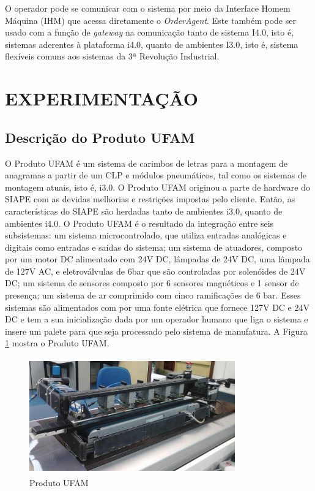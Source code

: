 \documentclass[10pt,letterpaper,twocolumn]{IEEEtran}
\begin{document}
O operador pode se comunicar com o sistema por meio da Interface Homem Máquina (IHM) que acessa diretamente o \textit{OrderAgent}. Este também pode ser usado com a função de \textit{gateway} na comunicação tanto de sistema I4.0, isto é, sistemas aderentes à plataforma i4.0, quanto de ambientes I3.0, isto é, sistema flexíveis comuns aos sistemas da 3ª Revolução Industrial.


\section{EXPERIMENTAÇÃO}	


\subsection{Descrição do Produto UFAM}

O Produto UFAM é um sistema de carimbos de letras para a montagem de anagramas a partir de um CLP e módulos
pneumáticos, tal como os sistemas de montagem atuais, isto é, i3.0.
O Produto UFAM originou a parte de hardware do SIAPE com as devidas melhorias e restrições impostas
pelo cliente. Então, as características do SIAPE são herdadas tanto de ambientes i3.0, quanto de 
ambientes i4.0.
O Produto UFAM é o resultado da integração entre seis subsistemas: um sistema microcontrolado, que utiliza 
entradas analógicas e digitais como entradas e saídas do sistema; um sistema de atuadores, composto por um 
motor DC alimentado com 24V DC, lâmpadas de 24V DC, uma lâmpada de 127V AC, e eletroválvulas de 6bar que são 
controladas por solenóides de 24V DC; um sistema de sensores composto por 6 sensores magnéticos e 1 sensor de 
presença; um sistema de ar comprimido com cinco ramificações de 6 bar. Esses sistemas são alimentados com por 
uma fonte elétrica que fornece 127V DC e 24V DC e tem a sua inicialização dada por um operador humano que liga 
o sistema e insere um palete para que seja processado pelo sistema de manufatura. A Figura \ref{F130} mostra o 
Produto UFAM.


\begin{figure}
	\centering
	\includegraphics[width=8.9cm, height=5cm]{MeDSE_imagens/F130_PRODUTO_UFAM.jpg} 
	\caption{Produto UFAM}
	\label{F130}
\end{figure}
\end{document}
